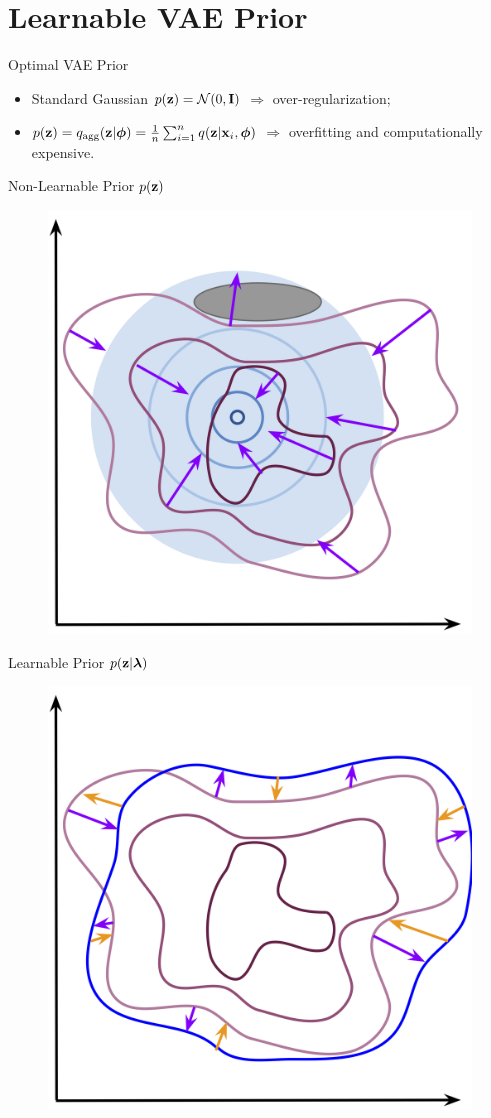 \documentclass{beamer}
\begin{document}
\section{Learnable VAE Prior}
\begin{frame}{Optimal VAE Prior}
	\begin{itemize}
		\item Standard Gaussian $p(\mathbf{z}) = \mathcal{N}(0, \mathbf{I})$ $\Rightarrow$ over-regularization;
		\item $p(\mathbf{z}) = q_{\text{agg}}(\mathbf{z} | \boldsymbol{\phi}) = \frac{1}{n}\sum_{i=1}^n q(\mathbf{z} | \mathbf{x}_i, \boldsymbol{\phi})$ $\Rightarrow$ overfitting and computationally expensive.
	\end{itemize}
	\vspace{-0.5cm}
	\begin{minipage}[t]{0.5\columnwidth}
		\begin{block}{Non-Learnable Prior $p(\mathbf{z})$}
			\begin{figure}[h]
				\centering
				\includegraphics[width=0.6\linewidth]{figs/non_learnable_prior}
			\end{figure}
		\end{block}
	\end{minipage}%
	\begin{minipage}[t]{0.5\columnwidth}
		\begin{block}{Learnable Prior $p(\mathbf{z} | \boldsymbol{\lambda})$}
			\begin{figure}[h]
				\centering
				\includegraphics[width=0.6\linewidth]{figs/learnable_prior}

\end{figure}
\end{block}
\end{minipage}
\end{frame}
\end{document}
